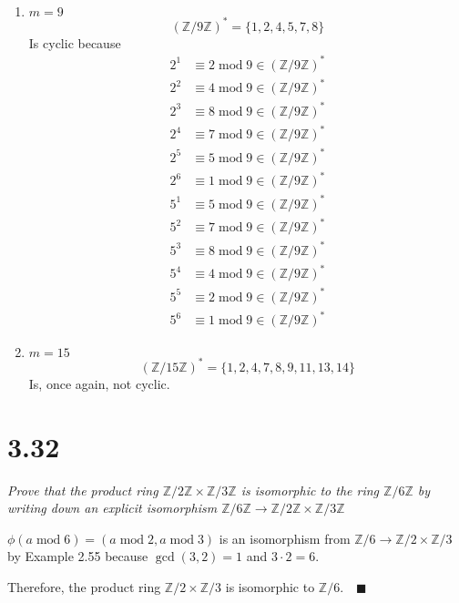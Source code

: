 \documentclass[12pt]{article}
\newcommand{\Z}{\mathbb{Z}}
\newcommand{\qed}{\quad \blacksquare}
\renewcommand{\mod}{\; \text{mod}\; }
\begin{document}
\begin{enumerate}[label=(\alph*)]
\begin{enumerate}
                \item $m = 9$
                \[(\Z/9\Z)^* = \{1, 2, 4, 5, 7, 8\}\]
                Is cyclic because 
                \begin{align*}
                    2^1 &\equiv 2 \mod 9 \in (\Z/9\Z)^*\\
                    2^2 &\equiv 4 \mod 9 \in (\Z/9\Z)^*\\
                    2^3 &\equiv 8 \mod 9 \in (\Z/9\Z)^*\\
                    2^4 &\equiv 7 \mod 9 \in (\Z/9\Z)^*\\
                    2^5 &\equiv 5 \mod 9 \in (\Z/9\Z)^*\\
                    2^6 &\equiv 1 \mod 9 \in (\Z/9\Z)^*\\
                    5^1 &\equiv 5 \mod 9 \in (\Z/9\Z)^*\\
                    5^2 &\equiv 7 \mod 9 \in (\Z/9\Z)^*\\
                    5^3 &\equiv 8 \mod 9 \in (\Z/9\Z)^*\\
                    5^4 &\equiv 4 \mod 9 \in (\Z/9\Z)^*\\
                    5^5 &\equiv 2 \mod 9 \in (\Z/9\Z)^*\\
                    5^6 &\equiv 1 \mod 9 \in (\Z/9\Z)^*
                \end{align*}

                \item $m = 15$
                \[(\Z/15\Z)^* = \{1, 2, 4, 7, 8, 9, 11, 13, 14\}\]
                Is, once again, not cyclic. 
            \end{enumerate}
        \color{black}
    \end{enumerate}


\pagebreak

\section*{3.32}
\emph{Prove that the product ring $\Z/2\Z \times \Z/3\Z$ is isomorphic to the ring $\Z/6\Z$ by writing down an
explicit isomorphism $\Z/6\Z \to \Z/2\Z \times \Z/3\Z$}

\color{blue}
    $\phi(a \mod 6) = (a \mod 2, a\mod 3)$ is an isomorphism from $\Z/6 \to \Z/2 \times \Z/3$ by Example 2.55 because $\gcd(3, 2) = 1$ and $3\cdot 2 = 6$.

    Therefore, the product ring $\Z/2 \times \Z/3$ is isomorphic to $\Z/6. \qed$

\color{black}
\end{document}
